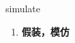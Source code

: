
\begin{frame}
{\huge simulate}
\begin{center}
\begin{enumerate}\Large
  \item \textbf{假装，模仿}
\end{enumerate}
\end{center}
\end{frame}
